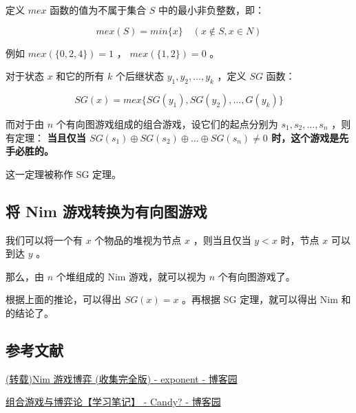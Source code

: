 定义 $mex$ 函数的值为不属于集合 $S$ 中的最小非负整数，即：

$$
mex(S)=min\{x\} \quad (x \notin S, x \in N)
$$

例如 $mex(\{0, 2, 4\})=1$ ， $mex(\{1, 2\})=0$ 。

对于状态 $x$ 和它的所有 $k$ 个后继状态 $y_1, y_2, \ldots, y_k$ ，定义 $SG$ 函数：

$$
SG(x)=mex\{SG(y_1), SG(y_2), \ldots, G(y_k)\}
$$

而对于由 $n$ 个有向图游戏组成的组合游戏，设它们的起点分别为 $s_1, s_2, \ldots, s_n$ ，则有定理：\textbf{ 当且仅当 $SG(s_1) \oplus SG(s_2) \oplus \ldots \oplus SG(s_n) \neq 0$ 时，这个游戏是先手必胜的。}

这一定理被称作 SG 定理。

\subsection{将 Nim 游戏转换为有向图游戏}

我们可以将一个有 $x$ 个物品的堆视为节点 $x$ ，则当且仅当 $y<x$ 时，节点 $x$ 可以到达 $y$ 。

那么，由 $n$ 个堆组成的 Nim 游戏，就可以视为 $n$ 个有向图游戏了。

根据上面的推论，可以得出 $SG(x)=x$ 。再根据 SG 定理，就可以得出 Nim 和的结论了。

\subsection{参考文献}

\href{http://www.cnblogs.com/exponent/articles/2141477.html}{(转载)Nim 游戏博弈 (收集完全版) - exponent - 博客园}

\href{https://www.cnblogs.com/candy99/p/6548836.html}{组合游戏与博弈论【学习笔记】 - Candy? - 博客园}
